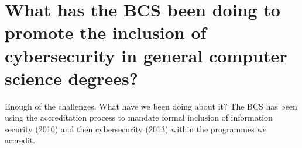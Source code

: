 \documentclass[a4paper,11pt]{article}
\begin{document}
\section*{What has the BCS been doing to promote the inclusion of cybersecurity in general computer science degrees? }

Enough of the challenges. What have we been doing about it? The BCS has been using the accreditation process to mandate formal inclusion of information security (2010) and then cybersecurity (2013) within the programmes we accredit. 


\end{document}

